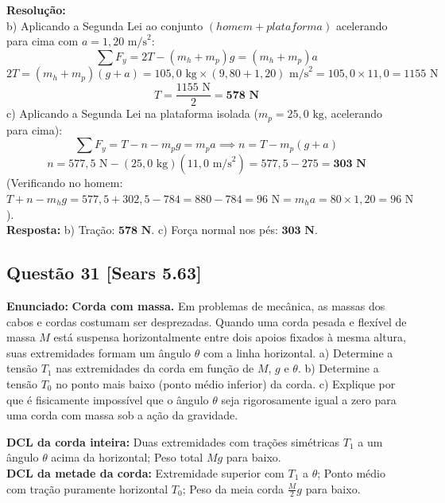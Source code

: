 \documentclass[11pt,a4paper]{article}
\begin{document}
\noindent
\textbf{Resolução:}\\
b) Aplicando a Segunda Lei ao conjunto $(homem + plataforma)$ acelerando para cima com $a = 1,20\text{ m/s}^2$:
\[ \sum F_y = 2T - (m_h + m_p)g = (m_h + m_p)a \]
\[ 2T = (m_h + m_p)(g + a) = 105,0\text{ kg} \times (9,80 + 1,20)\text{ m/s}^2 = 105,0 \times 11,0 = 1155\text{ N} \]
\[ T = \frac{1155\text{ N}}{2} = \mathbf{578\text{ N}} \]
c) Aplicando a Segunda Lei na plataforma isolada ($m_p = 25,0\text{ kg}$, acelerando para cima):
\[ \sum F_y = T - n - m_p g = m_p a \implies n = T - m_p(g + a) \]
\[ n = 577,5\text{ N} - (25,0\text{ kg})(11,0\text{ m/s}^2) = 577,5 - 275 = \mathbf{303\text{ N}} \]
(Verificando no homem: $T + n - m_h g = 577,5 + 302,5 - 784 = 880 - 784 = 96\text{ N} = m_h a = 80 \times 1,20 = 96\text{ N}$).\\
\textbf{Resposta:} b) Tração: $\mathbf{578\text{ N}}$. c) Força normal nos pés: $\mathbf{303\text{ N}}$.

\vspace{0.3cm}
\subsection*{Questão 31 [Sears 5.63]}
\textbf{Enunciado:} \textbf{Corda com massa.} Em problemas de mecânica, as massas dos cabos e cordas costumam ser desprezadas. Quando uma corda pesada e flexível de massa $M$ está suspensa horizontalmente entre dois apoios fixados à mesma altura, suas extremidades formam um ângulo $\theta$ com a linha horizontal. a) Determine a tensão $T_1$ nas extremidades da corda em função de $M$, $g$ e $\theta$. b) Determine a tensão $T_0$ no ponto mais baixo (ponto médio inferior) da corda. c) Explique por que é fisicamente impossível que o ângulo $\theta$ seja rigorosamente igual a zero para uma corda com massa sob a ação da gravidade.

\begin{dclbox}
\textbf{DCL da corda inteira:} Duas extremidades com trações simétricas $T_1$ a um ângulo $\theta$ acima da horizontal; Peso total $Mg$ para baixo.\\
\textbf{DCL da metade da corda:} Extremidade superior com $T_1$ a $\theta$; Ponto médio com tração puramente horizontal $T_0$; Peso da meia corda $\frac{M}{2}g$ para baixo.
\end{dclbox}
\end{document}

